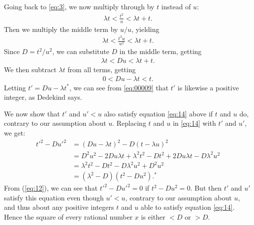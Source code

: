 \documentclass[twoside,openright]{article}
\begin{document}
Going back to \eqref{eq:3}, we now
multiply through by $t$ instead of $u$: 
\begin{align}
  \lambda t < \frac{t^2}{u} < \lambda t + t.\label{eq:7}
  \end{align}
Then we multiply the middle term by $u/u$, yielding
\begin{align}
  \lambda t< \frac{t^2u}{u^2} < \lambda t + t.\label{eq:8}
  \end{align}
Since $D=t^2/u^2$, we can substitute $D$ in the
middle term, getting
\begin{align}
  \label{eq:9}
  \lambda t< Du < \lambda t + t.
\end{align}
We then subtract $\lambda t$ from all terms, getting
\begin{align}
  \label{eq:00009}
0<Du-\lambda t<t.  
\end{align}
Letting $t'=Du-\lambda t^*$, we can see from \eqref{eq:00009}
that $t'$ is likewise a positive integer, as
Dedekind says.

We now show that $t'$ and $u'<u$ also satisfy equation
\eqref{eq:14} above if $t$ and $u$ do, contrary to our
assumption about $u$. Replacing
$t$ and $u$ in \eqref{eq:14} with $t'$ and $u'$, we get:
\begin{align}
  t'^2-Du'^2&=(Du-\lambda t)^2-D(t-\lambda u)^2\label{eq:10}\\
            &=D^2u^2-2Du\lambda t+\lambda^2t^2-Dt^2+2Du\lambda t-D\lambda^2u^2\label{eq:000100}\\
            &=\lambda^2t^2-Dt^2-D\lambda^2u^2+D^2u^2\label{eq:11}\\
            &=(\lambda^2-D)(t^2-Du^2).^*\label{eq:12}
\end{align}
From (\ref{eq:12}), we can see that $t'^2-Du'^2=0$ if
$t^2-Du^2=0$. But then $t'$ and $u'$ satisfy this equation even though
$u'<u$, contrary to our assumption about $u$, and thus about any
positive integers $t$ and $u$ able to satisfy equation
\eqref{eq:14}. Hence the square of every rational number $x$ is either
$<D$ or $>D$.
\end{document}
